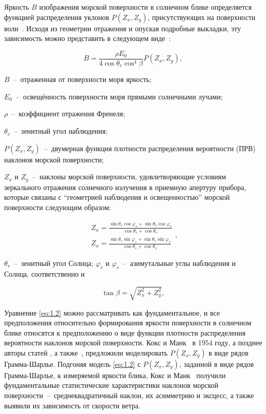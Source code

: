 Яркость $B$ изображения морской поверхности в солнечном блике определяется функцией распределения уклонов $P(Z_{x} ,Z_{y} )$, присутствующих на поверхности волн~\citep{Cox1954, Cox1954a}. Исходя из геометрии отражения и опуская подробные выкладки, эту зависимость можно представить в следующем виде~\citep{1988}:


\begin{equation} \label{eq:1.2} 
    B=\frac{\rho E_{0} }{4\cos \theta _{v} \cos ^{4} \beta } P(Z_{x} ,Z_{y} ), 
\end{equation} 


 $B$~--~отраженная от поверхности моря яркость;

\noindent$E_{0}$~--~освещённость поверхности моря прямыми солнечными лучами;

\noindent$\rho$~--~коэффициент отражения Френеля;

\noindent$\theta _{v}$~--~зенитный угол наблюдения;

\noindent$P(Z_{x}, Z_{y})$~--~двумерная функция плотности распределения вероятности (ПРВ) наклонов морской поверхности; 

\noindent$Z_{x} $ и $Z_{y}$~--~наклоны морской поверхности, удовлетворяющие условиям зеркального отражения солнечного излучения в приемную апертуру прибора, которые связаны с ``геометрией наблюдения и освещенностью'' морской поверхности следующим образом:


\begin{equation} \label{eq:1.3}
    \begin{array}{l} {Z_{x} =\frac{\sin \theta _{s} \cos \varphi _{s} +\sin \theta _{v} \cos \varphi _{v} }{\cos \theta _{s} +\cos \theta _{v} } } \\ {Z_{x} =\frac{\sin \theta _{s} \sin \varphi _{s} +\sin \theta _{v} \sin \varphi _{v} }{\cos \theta _{s} +\cos \theta _{v} } } \end{array},
\end{equation}



\noindent$\theta _{s} $~--~зенитный угол Солнца; $\varphi _{v} $ и $\varphi _{s} $~--~азимутальные углы наблюдения и Солнца, соответственно и


\begin{equation} \label{eq:1.4} 
    \tan \beta =\sqrt{Z_{x}^{2} +Z_{y}^{2} } , 
\end{equation} 


Уравнение \eqref{eq:1.2} можно рассматривать как фундаментальное, и все предположения относительно формирования яркости поверхности в солнечном блике относятся к предположению о виде функции плотности распределения вероятности наклонов морской поверхности. Кокс и Манк~\citep{Cox1954, Cox1954a} в 1954 году, а позднее авторы статей \citep{Chapron2000, Ebuchi2002}, а также~\citep{Breon2006}, предложили моделировать $P(Z_{x} ,Z_{y} )$ в виде рядов Грамма-Шарлье. Подгоняя модель \eqref{eq:1.2} с $P(Z_{x} ,Z_{y} )$, заданной в виде рядов Грамма-Шарлье, к измеряемой яркости блика, Кокс и Манк~\citep{Cox1954, Cox1954a} получили фундаментальные статистические характеристики наклонов морской поверхности~--~среднеквадратичный наклон, их асимметрию и эксцесс, а также выявили их зависимость от скорости ветра.



